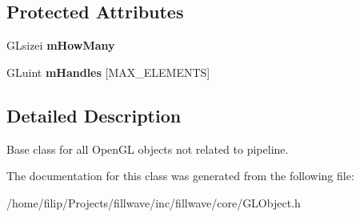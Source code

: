 \subsection*{Protected Attributes}
\begin{DoxyCompactItemize}
\item 
G\+Lsizei {\bfseries m\+How\+Many}\hypertarget{classflw_1_1flc_1_1GLObject_a295b5e3514f7b8f16cd0f9e73f3071f3}{}\label{classflw_1_1flc_1_1GLObject_a295b5e3514f7b8f16cd0f9e73f3071f3}

\item 
G\+Luint {\bfseries m\+Handles} \mbox{[}M\+A\+X\+\_\+\+E\+L\+E\+M\+E\+N\+TS\mbox{]}\hypertarget{classflw_1_1flc_1_1GLObject_a7a46e87fca26ddc35dc2ccb930b454f3}{}\label{classflw_1_1flc_1_1GLObject_a7a46e87fca26ddc35dc2ccb930b454f3}

\end{DoxyCompactItemize}


\subsection{Detailed Description}
Base class for all Open\+GL objects not related to pipeline. 

The documentation for this class was generated from the following file\+:\begin{DoxyCompactItemize}
\item 
/home/filip/\+Projects/fillwave/inc/fillwave/core/G\+L\+Object.\+h\end{DoxyCompactItemize}
